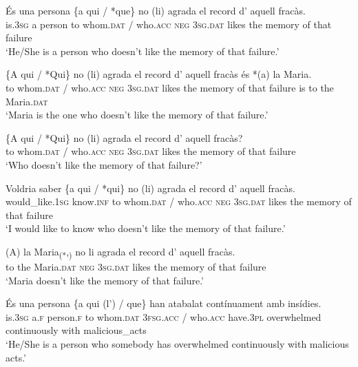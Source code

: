 \documentclass[output=paper,colorlinks,citecolor=brown,modfonts,nonflat]{langsci/langscibook}
\begin{document}
{{\ea%
 \label{ex:royo:15}

 \ea\label{ex:royo:15a}
 \gll És una persona \{a qui / *que\} no (li) agrada el record d’ aquell fracàs.\\
 is.\textsc{3sg}  a person to whom.\textsc{dat} / who.\textsc{acc} \textsc{neg} \textsc{3sg.dat} likes the memory of that failure\\
\glt ‘He/She is a person who doesn’t like the memory of that failure.’

 \ex \label{ex:royo:15b}
 \gll  \{A qui / *Qui\} no (li) agrada el record d’ aquell fracàs és *(a) la Maria.\\
  to whom.\textsc{dat} / who.\textsc{acc} \textsc{neg} \textsc{3sg.dat} likes the memory of that failure is to the Maria.\textsc{dat}\\
\glt ‘Maria is the one who doesn’t like the memory of that failure.’



 \ex \label{ex:royo:15c}
 \gll \{A qui / *Qui\} no (li) agrada el record d’ aquell fracàs?\\
 to whom.\textsc{dat} / who.\textsc{acc} \textsc{neg} \textsc{3sg.dat} likes the memory of that failure\\
\glt ‘Who doesn’t like the memory of that failure?’

 \ex \label{ex:royo:15d}
 \gll Voldria saber \{a qui / *qui\} no (li) agrada el record d’ aquell fracàs.\\
 would\_like.\textsc{1sg} know.\textsc{inf} to whom.\textsc{dat} / who.\textsc{acc} \textsc{neg} \textsc{3sg.dat} likes the memory of that failure\\
\glt ‘I would like to know who doesn’t like the memory of that failure.’

 \ex \label{ex:royo:15e}
 \gll *(A) la Maria\textsubscript{(*},\textsubscript{)} no li agrada el record d’ aquell fracàs.\\
 to the Maria.\textsc{dat} \textsc{neg} \textsc{3sg.dat} likes the memory of that failure\\
\glt ‘Maria doesn’t like the memory of that failure.’

 \z
 \z


\ea%
 \label{ex:royo:16}
 \ea \label{ex:royo:16a}
 \gll És una persona \{a qui (l’) / que\} han atabalat contínuament amb insídies.\\
 is.\textsc{3sg} a.\textsc{f}  person.\textsc{f} to whom.\textsc{dat} \textsc{3fsg.acc} / who.\textsc{acc} have.\textsc{3pl} overwhelmed continuously with malicious\_acts\\
\glt ‘He/She is a person who somebody has overwhelmed continuously with malicious acts.’

}}
\end{document}
